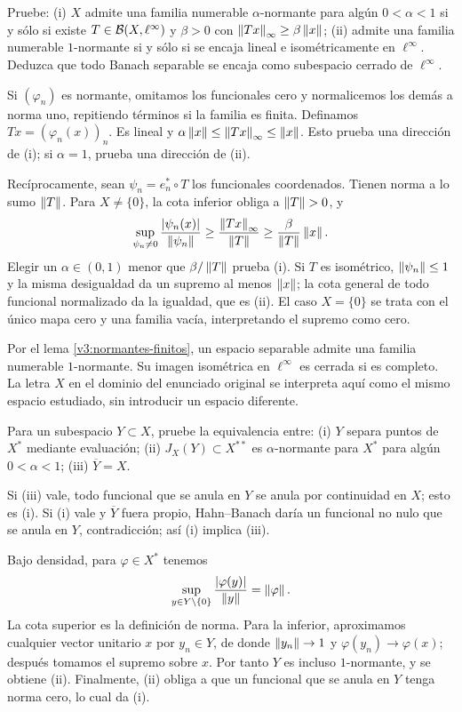 \begin{ejercicio}\label{ej:v3-l17-3}
Pruebe: (i) $X$ admite una familia numerable $\alpha$-normante para algún $0<\alpha<1$ si y sólo si existe $T\in\mathcal B(X,\ell^\infty)$ y $\beta>0$ con $\left\lVert Tx\right\rVert_\infty\geq\beta\left\lVert x\right\rVert$; (ii) admite una familia numerable $1$-normante si y sólo si se encaja lineal e isométricamente en $\ell^\infty$. Deduzca que todo Banach separable se encaja como subespacio cerrado de $\ell^\infty$.
\end{ejercicio}
\begin{solucion}
Si $(\varphi_n)$ es normante, omitamos los funcionales cero y normalicemos los demás a norma uno, repitiendo términos si la familia es finita. Definamos $Tx=(\varphi_n(x))_n$. Es lineal y
$\alpha\left\lVert x\right\rVert\leq\left\lVert Tx\right\rVert_\infty\leq\left\lVert x\right\rVert$. Esto prueba una dirección de (i); si $\alpha=1$, prueba una dirección de (ii).

Recíprocamente, sean $\psi_n=e_n^*\circ T$ los funcionales coordenados. Tienen norma a lo sumo $\left\lVert T\right\rVert$. Para $X\ne\{0\}$, la cota inferior obliga a $\left\lVert T\right\rVert>0$, y
\[
 \sup_{\psi_n\ne0}\frac{|\psi_n(x)|}{\left\lVert\psi_n\right\rVert}
 \geq\frac{\left\lVert Tx\right\rVert_\infty}{\left\lVert T\right\rVert}
 \geq\frac\beta{\left\lVert T\right\rVert}\left\lVert x\right\rVert.
\]
Elegir un $\alpha\in(0,1)$ menor que $\beta/\left\lVert T\right\rVert$ prueba (i). Si $T$ es isométrico, $\left\lVert\psi_n\right\rVert\leq1$ y la misma desigualdad da un supremo al menos $\left\lVert x\right\rVert$; la cota general de todo funcional normalizado da la igualdad, que es (ii). El caso $X=\{0\}$ se trata con el único mapa cero y una familia vacía, interpretando el supremo como cero.

Por el lema \ref{v3:normantes-finitos}, un espacio separable admite una familia numerable $1$-normante. Su imagen isométrica en $\ell^\infty$ es cerrada si es completo. La letra $X$ en el dominio del enunciado original se interpreta aquí como el mismo espacio estudiado, sin introducir un espacio diferente.
\end{solucion}

\begin{ejercicio}\label{ej:v3-l17-4}
Para un subespacio $Y\subset X$, pruebe la equivalencia entre: (i) $Y$ separa puntos de $X^*$ mediante evaluación; (ii) $J_X(Y)\subset X^{**}$ es $\alpha$-normante para $X^*$ para algún $0<\alpha<1$; (iii) $\overline Y=X$.
\end{ejercicio}
\begin{solucion}
Si (iii) vale, todo funcional que se anula en $Y$ se anula por continuidad en $X$; esto es (i). Si (i) vale y $\overline Y$ fuera propio, Hahn--Banach daría un funcional no nulo que se anula en $Y$, contradicción; así (i) implica (iii).

Bajo densidad, para $\varphi\in X^*$ tenemos
\[
 \sup_{y\in Y\setminus\{0\}}\frac{|\varphi(y)|}{\left\lVert y\right\rVert}=\left\lVert\varphi\right\rVert.
\]
La cota superior es la definición de norma. Para la inferior, aproximamos cualquier vector unitario $x$ por $y_n\in Y$, de donde $\left\lVert y_n\right\rVert\to1$ y $\varphi(y_n)\to\varphi(x)$; después tomamos el supremo sobre $x$. Por tanto $Y$ es incluso $1$-normante, y se obtiene (ii). Finalmente, (ii) obliga a que un funcional que se anula en $Y$ tenga norma cero, lo cual da (i).
\end{solucion}

